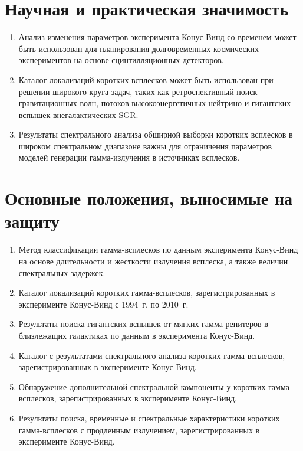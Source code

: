 \section*{Научная и практическая значимость}

\begin{enumerate}
\item Анализ изменения параметров эксперимента Конус-Винд со временем может быть использован
 для планирования долговременных космических экспериментов на основе сцинтилляционных детекторов.
\item Каталог локализаций коротких всплесков может быть использован при решении 
 широкого круга задач, таких как ретроспективный поиск гравитационных волн, потоков высокоэнергетичных нейтрино 
 и гигантских вспышек внегалактических SGR.
\item Результаты спектрального анализа обширной выборки коротких всплесков 
в широком спектральном диапазоне важны для ограничения параметров
моделей генерации гамма-излучения в источниках всплесков.
\end{enumerate}

\section*{Основные положения, выносимые на защиту}

\begin{enumerate}
\item Метод классификации гамма-всплесков по данным эксперимента Конус-Винд на основе
    длительности и жесткости излучения всплеска, а также величин спектральных задержек.
\item Каталог локализаций коротких гамма-всплесков, зарегистрированных в эксперименте
    Конус-Винд с 1994~г. по 2010~г.
\item Результаты поиска гигантских вспышек от мягких гамма-репитеров 
    в близлежащих галактиках по данным в эксперимента Конус-Винд. 
\item Каталог с результатами спектрального анализа коротких гамма-всплесков, 
    зарегистрированных в эксперименте Конус-Винд.
\item Обнаружение дополнительной спектральной компоненты у коротких гамма-всплесков, 
    зарегистрированных в эксперименте Конус-Винд.
\item Результаты поиска, временные и спектральные характеристики коротких гамма-всплесков 
    с продленным излучением, зарегистрированных в эксперименте Конус-Винд.
\end{enumerate}

